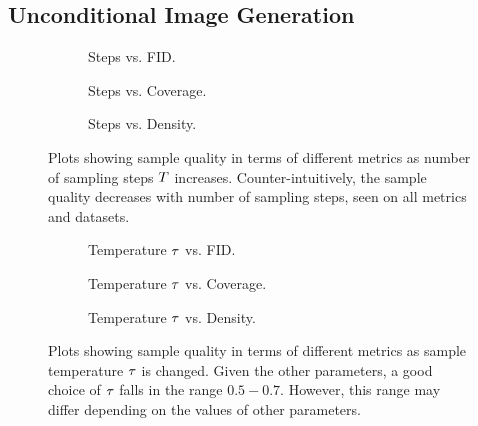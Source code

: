 \subsection{Unconditional Image Generation}
\label{subsec:evaluationUnconditional}

\begin{figure}
    \centering
    \begin{subfigure}[b]{0.33\textwidth}
        \centering
        \resizebox{\textwidth}{!}{
            
        }
        \caption{Steps vs. FID.}
    \end{subfigure}
    \hfill
    \begin{subfigure}[b]{0.33\textwidth}
        \centering
        \resizebox{\textwidth}{!}{
            
        }
        \caption{Steps vs. Coverage.}
    \end{subfigure}
    \hfill
    \begin{subfigure}[b]{0.33\textwidth}
        \centering
        \resizebox{\textwidth}{!}{
            
        }
        \caption{Steps vs. Density.}
    \end{subfigure}
    \caption{
        Plots showing sample quality in terms of different metrics as
        number of sampling steps $T$ increases. Counter-intuitively, the
        sample quality decreases with number of sampling steps, seen on
        all metrics and datasets.
    }
    \label{fig:step}
\end{figure}

\begin{figure}
    \begin{subfigure}[b]{0.33\textwidth}
        \centering
        \resizebox{\textwidth}{!}{
            
        }
        \caption{Temperature $\tau$ vs. FID.}
    \end{subfigure}
    \hfill
    \begin{subfigure}[b]{0.33\textwidth}
        \centering
        \resizebox{\textwidth}{!}{
            
        }
        \caption{Temperature $\tau$ vs. Coverage.}
    \end{subfigure}
    \hfill
    \begin{subfigure}[b]{0.33\textwidth}
        \centering
        \resizebox{\textwidth}{!}{
            
        }
        \caption{Temperature $\tau$ vs. Density.}
    \end{subfigure}
    \caption{
        Plots showing sample quality in terms of different metrics as sample
        temperature $\tau$ is changed. Given the other parameters, a good choice
        of $\tau$ falls in the range $0.5-0.7$. However, this range may
        differ depending on the values of other parameters.
    }
    \label{fig:temp}
\end{figure}

